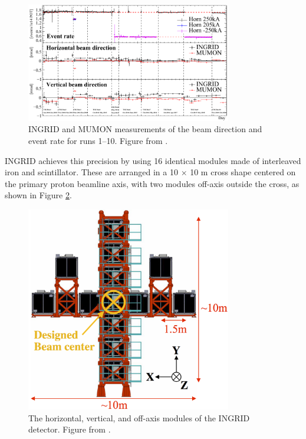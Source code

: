 \begin{figure}
\centering
\includegraphics*[width=0.8\textwidth,clip]{figs/ingrid_official_mumon_si_ic}
\caption{INGRID and MUMON measurements of the beam direction and event rate for runs 1--10. Figure from \cite{kikawa_2020}.} \label{mumoningrid}
\end{figure}

INGRID achieves this precision by using 16 identical modules made of interleaved iron and scintillator. These are arranged in a 10 $\times$ 10 m cross shape centered on the primary proton beamline axis, with two modules off-axis outside the cross, as shown in Figure \ref{ingridcross}. 

\begin{figure}
\centering
\includegraphics*[width=0.8\textwidth,clip]{figs/ingridcross}
\caption{The horizontal, vertical, and off-axis modules of the INGRID detector. Figure from \cite{tript}.} \label{ingridcross}
\end{figure}

